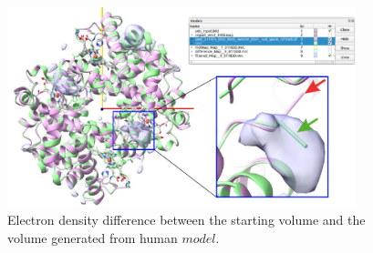 \begin{itemize}
\begin{itemize}
  \begin{figure}[H]
    \centering 
    \captionsetup{width=.7\linewidth} 
    \includegraphics[width=0.90\textwidth]{Images/Fig44}
    \caption{Electron density difference between the starting volume  and the volume generated from human  $model$.}
    \label{fig:chimera_operate_vol_3}
   \end{figure}
  
  
  \end{itemize}
 
\end{itemize}
